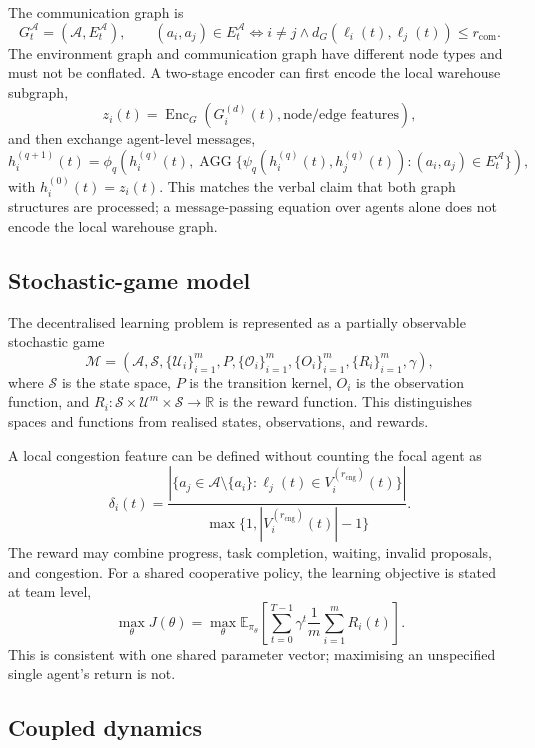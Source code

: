 \documentclass[../main.tex]{subfiles}
\begin{document}
The communication graph is
\[
G^{\mathcal A}_t=(\mathcal{A},E^{\mathcal A}_t),
\qquad
(a_i,a_j)\in E^{\mathcal A}_t
\iff i\neq j\land
d_G(\ell_i(t),\ell_j(t))\leq r_{\mathrm{com}}.
\]
The environment graph and communication graph have different node types and
must not be conflated. A two-stage encoder can first encode the local
warehouse subgraph,
\[
z_i(t)=\operatorname{Enc}_{G}(G_i^{(d)}(t),\text{node/edge features}),
\]
and then exchange agent-level messages,
\[
h_i^{(q+1)}(t)=\phi_q\!\left(
 h_i^{(q)}(t),
 \operatorname{AGG}\{\psi_q(h_i^{(q)}(t),h_j^{(q)}(t)):
 (a_i,a_j)\in E^{\mathcal A}_t\}
\right),
\]
with \(h_i^{(0)}(t)=z_i(t)\). This matches the verbal claim that both graph
structures are processed; a message-passing equation over agents alone does
not encode the local warehouse graph.

\subsection{Stochastic-game model}

The decentralised learning problem is represented as a partially observable
stochastic game
\[
\mathcal{M}=\left(
 \mathcal{A},\mathcal{S},
 \{\mathcal{U}_i\}_{i=1}^{m},
 P,\{\mathcal{O}_i\}_{i=1}^{m},
 \{O_i\}_{i=1}^{m},
 \{R_i\}_{i=1}^{m},\gamma
\right),
\]
where \(\mathcal{S}\) is the state space, \(P\) is the transition kernel,
\(O_i\) is the observation function, and
\(R_i:\mathcal{S}\times\mathcal{U}^m\times\mathcal{S}\to\mathbb{R}\) is the
reward function. This distinguishes spaces and functions from realised states,
observations, and rewards.

A local congestion feature can be defined without counting the focal agent as
\[
\delta_i(t)=
\frac{
 |\{a_j\in\mathcal{A}\setminus\{a_i\}:
 \ell_j(t)\in V_i^{(r_{\mathrm{cng}})}(t)\}|
}{
 \max\{1,|V_i^{(r_{\mathrm{cng}})}(t)|-1\}
}.
\]
The reward may combine progress, task completion, waiting, invalid proposals,
and congestion. For a shared cooperative policy, the learning objective is
stated at team level,
\[
\max_\theta J(\theta)
=
\max_\theta
\mathbb{E}_{\pi_\theta}
\left[
\sum_{t=0}^{T-1}\gamma^t
\frac{1}{m}\sum_{i=1}^{m}R_i(t)
\right].
\]
This is consistent with one shared parameter vector; maximising an unspecified
single agent's return is not.

\subsection{Coupled dynamics}
\end{document}
